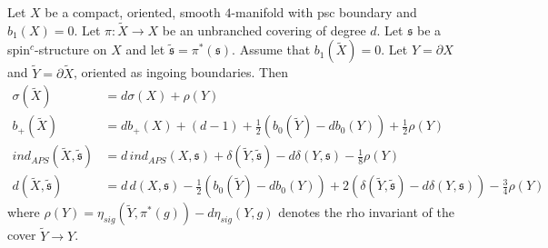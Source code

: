 \documentclass[10pt,a4paper]{amsart}
\begin{document}
\begin{proposition}\label{prop:ubcov}
Let $X$ be a compact, oriented, smooth $4$-manifold with psc boundary and $b_1(X) = 0$. Let $\pi : \widetilde{X} \to X$ be an unbranched covering of degree $d$. Let $\mathfrak{s}$ be a spin$^c$-structure on $X$ and let $\widetilde{\mathfrak{s}} = \pi^*(\mathfrak{s})$. Assume that $b_1(\widetilde{X}) = 0$. Let $Y = \partial X$ and $\widetilde{Y} = \partial \widetilde{X}$, oriented as ingoing boundaries. Then
\begin{align*}
\sigma(\widetilde{X}) &= d \sigma(X) + \rho(Y) \\
b_+(\widetilde{X}) &= d b_+(X) + (d-1) + \frac{1}{2}( b_0(\widetilde{Y}) - d b_0(Y) ) + \frac{1}{2}\rho(Y) \\
ind_{APS}(\widetilde{X} , \widetilde{\mathfrak{s}}) &= d \, ind_{APS}(X,\mathfrak{s}) + \delta(\widetilde{Y},\widetilde{\mathfrak{s}}) - d \delta(Y ,\mathfrak{s}) - \frac{1}{8}\rho(Y) \\
d(\widetilde{X} , \widetilde{\mathfrak{s}}) &= d \, d(X,\mathfrak{s}) - \frac{1}{2}(b_0(\widetilde{Y}) - d b_0(Y)) + 2(\delta(\widetilde{Y},\widetilde{\mathfrak{s}}) - d \delta(Y,\mathfrak{s})) - \frac{3}{4}\rho(Y)
\end{align*}
where $\rho(Y) = \eta_{sig}( \widetilde{Y} , \pi^*(g) ) - d \eta_{sig}(Y , g)$ denotes the rho invariant of the cover $\widetilde{Y} \to Y$.
\end{proposition}
\end{document}
